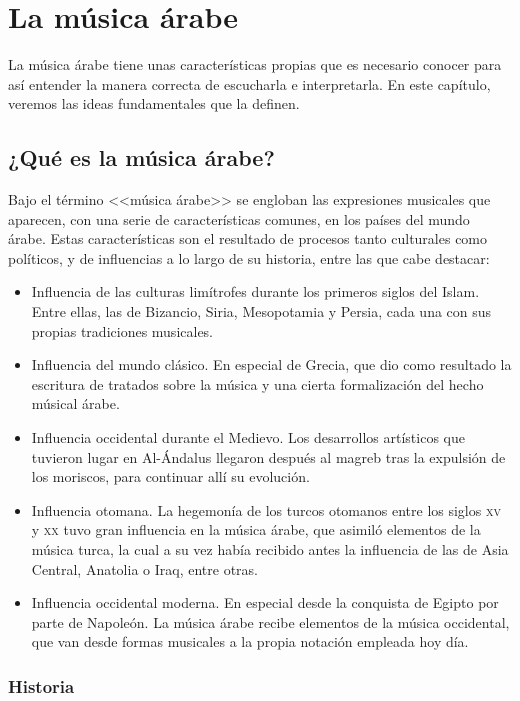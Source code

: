 \chapter{La música árabe}

    La música árabe tiene unas características propias que es necesario conocer para así entender la manera correcta de escucharla e interpretarla. En este capítulo, veremos las ideas fundamentales que la definen.

    \section{¿Qué es la música árabe?}

    Bajo el término <<música árabe>> se engloban las expresiones musicales que aparecen, con una serie de características comunes, en los países del mundo árabe. Estas características son el resultado de procesos tanto culturales como políticos, y de influencias a lo largo de su historia, entre las que cabe destacar:

    \begin{itemize}
    \item Influencia de las culturas limítrofes durante los primeros siglos del Islam. Entre ellas, las de Bizancio, Siria, Mesopotamia y Persia, cada una con sus propias tradiciones musicales.
    \item Influencia del mundo clásico. En especial de Grecia, que dio como resultado la escritura de tratados sobre la música y una cierta formalización del hecho músical árabe.
    \item Influencia occidental durante el Medievo. Los desarrollos artísticos que tuvieron lugar en Al-Ándalus llegaron después al magreb tras la expulsión de los moriscos, para continuar allí su evolución.
    \item Influencia otomana. La hegemonía de los turcos otomanos entre los siglos \textsc{xv} y \textsc{xx} tuvo gran influencia en la música árabe, que asimiló elementos de la música turca, la cual a su vez había recibido antes la influencia de las de Asia Central, Anatolia o Iraq, entre otras.
    \item Influencia occidental moderna. En especial desde la conquista de Egipto por parte de Napoleón. La música árabe recibe elementos de la música occidental, que van desde formas musicales a la propia notación empleada hoy día.
    \end{itemize}

    \subsection{Historia}

